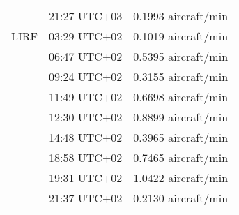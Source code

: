 \begin{tabular}{ccr}
     & 21:27 UTC+03 &  0.1993 aircraft/min \\
LIRF & 03:29 UTC+02 &  0.1019 aircraft/min \\
     & 06:47 UTC+02 &  0.5395 aircraft/min \\
     & 09:24 UTC+02 &  0.3155 aircraft/min \\
     & 11:49 UTC+02 &  0.6698 aircraft/min \\
     & 12:30 UTC+02 &  0.8899 aircraft/min \\
     & 14:48 UTC+02 &  0.3965 aircraft/min \\
     & 18:58 UTC+02 &  0.7465 aircraft/min \\
     & 19:31 UTC+02 &  1.0422 aircraft/min \\
     & 21:37 UTC+02 &  0.2130 aircraft/min \\
\bottomrule
\end{tabular}
